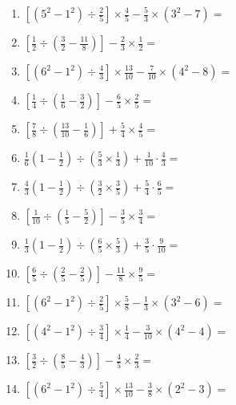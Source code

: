 \documentclass[12pt]{article}
\begin{document}
\begin{enumerate}[ itemsep=1.5cm]
	\item $\displaystyle \left[ \left( 5^2 - 1^2 \right) \div \frac{2}{5} \right] \times \frac{4}{5} - \frac{5}{3} \times \left( 3^2 - 7 \right) =$
	\item $\displaystyle \left[ \frac{1}{2} \div \left( \frac{3}{2} - \frac{11}{8} \right) \right] - \frac{2}{3} \times \frac{1}{2} =$
	\item $\displaystyle \left[ \left( 6^2 - 1^2 \right) \div \frac{4}{3} \right] \times \frac{13}{10} - \frac{7}{10} \times \left( 4^2 - 8 \right) =$
	\item $\displaystyle \left[ \frac{1}{4} \div \left( \frac{1}{6} - \frac{3}{2} \right) \right] - \frac{6}{5} \times \frac{2}{5} =$
	\item $\displaystyle \left[ \frac{7}{8} \div \left( \frac{13}{10} - \frac{1}{6} \right) \right] + \frac{5}{4} \times \frac{4}{5} =$
	\item $\displaystyle \frac{1}{6} \left( 1 - \frac{1}{2} \right) \div \left( \frac{5}{3} \times \frac{1}{3} \right) + \frac{1}{10} \cdot \frac{4}{3} =$
	\item $\displaystyle \frac{4}{3} \left( 1 - \frac{1}{2} \right) \div \left( \frac{3}{2} \times \frac{3}{5} \right) + \frac{5}{4} \cdot \frac{6}{5} =$
	\item $\displaystyle \left[ \frac{1}{10} \div \left( \frac{1}{5} - \frac{5}{2} \right) \right] - \frac{3}{5} \times \frac{3}{4} =$
	\item $\displaystyle \frac{1}{3} \left( 1 - \frac{1}{2} \right) \div \left( \frac{6}{5} \times \frac{5}{3} \right) + \frac{3}{5} \cdot \frac{9}{10} =$

	\item $\displaystyle \left[ \frac{6}{5} \div \left( \frac{2}{5} - \frac{2}{5} \right) \right] - \frac{11}{8} \times \frac{9}{5} =$
	\item $\displaystyle \left[ \left( 6^2 - 1^2 \right) \div \frac{2}{5} \right] \times \frac{5}{8} - \frac{1}{3} \times \left( 3^2 - 6 \right) =$
	\item $\displaystyle \left[ \left( 4^2 - 1^2 \right) \div \frac{3}{4} \right] \times \frac{1}{4} - \frac{3}{10} \times \left( 4^2 - 4 \right) =$
	\item $\displaystyle \left[ \frac{3}{2} \div \left( \frac{8}{5} - \frac{4}{3} \right) \right] - \frac{4}{5} \times \frac{2}{3} =$
	\item $\displaystyle \left[ \left( 6^2 - 1^2 \right) \div \frac{5}{4} \right] \times \frac{13}{10} - \frac{3}{8} \times \left( 2^2 - 3 \right) =$
\end{enumerate}
\end{document}
